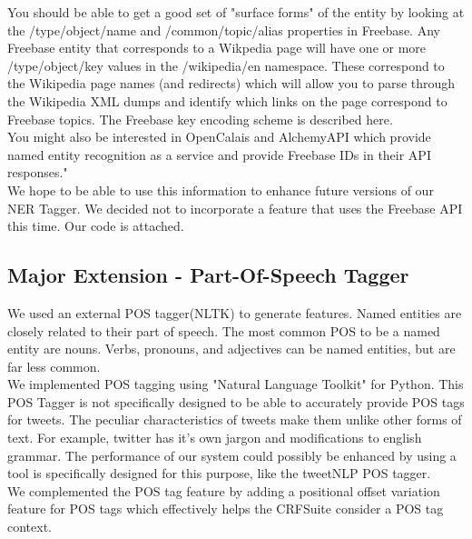 \documentclass[a4paper]{article}
\begin{document}
You should be able to get a good set of "surface forms" of the entity by looking at the /type/object/name and /common/topic/alias properties in Freebase. Any Freebase entity that corresponds to a Wikpedia page will have one or more /type/object/key values in the /wikipedia/en namespace. These correspond to the Wikipedia page names (and redirects) which will allow you to parse through the Wikipedia XML dumps and identify which links on the page correspond to Freebase topics. The Freebase key encoding scheme is described here. \\

You might also be interested in OpenCalais and AlchemyAPI which provide named entity recognition as a service and provide Freebase IDs in their API responses."\cite{so}\\

We hope to be able to use this information to enhance future versions of our NER Tagger. We decided not to incorporate a feature that uses the Freebase API this time. Our code is attached. \\


\subsection{Major Extension - Part-Of-Speech Tagger}

We used an external POS tagger(NLTK) to generate features.\cite{loper2002nltk} Named entities are closely related to their part of speech. The most common POS to be a named entity are nouns. Verbs, pronouns, and adjectives can be named entities, but are far less common. \\

We implemented POS tagging using "Natural Language Toolkit" for Python. This POS Tagger is not specifically designed to be able to accurately provide POS tags for tweets. The peculiar characteristics of tweets make them unlike other forms of text. For example, twitter has it's own jargon and modifications to english grammar. The performance of our system could possibly be enhanced by using a tool is specifically designed for this purpose, like the tweetNLP POS tagger. \cite{gimpel2011part}\\

We complemented the POS tag feature by adding a positional offset variation feature for POS tags which effectively helps the CRFSuite consider a POS tag context. \\

\newpage
\end{document}
